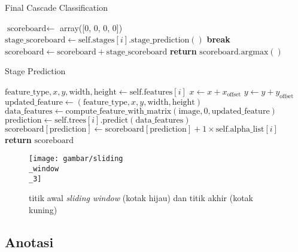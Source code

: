 \begin{algorithm}
  \caption{Final Cascade Classification}
  \begin{algorithmic}[1]
      \State $\text{scoreboard} \gets$ array([0, 0, 0, 0])
        \State $\text{stage\_scoreboard} \gets \text{self.stages}[i].\text{stage\_prediction}()$
         \textbf{break}
        \Else \State $\text{scoreboard} \gets \text{scoreboard} + \text{stage\_scoreboard}$ \EndIf
      \EndFor
      \State \textbf{return} $\text{scoreboard}.\text{argmax}()$
    \EndFunction
  \end{algorithmic}
\end{algorithm}

\begin{algorithm}
  \caption{Stage Prediction}
  \begin{algorithmic}[1]
        \State $\text{feature\_type}, x, y, \text{width}, \text{height} \gets \text{self.features}[i]$
        \State $x \gets x + x_{\text{offset}}$
        \State $y \gets y + y_{\text{offset}}$
        \State $\text{updated\_feature} \gets (\text{feature\_type}, x, y, \text{width}, \text{height})$
        \State $\text{data\_features} \gets \text{compute\_feature\_with\_matrix}(\text{image}, 0, \text{updated\_feature})$
        \State $\text{prediction} \gets \text{self.trees}[i].\text{predict}(\text{data\_features})$
        \State $\text{scoreboard}[\text{prediction}] \gets \text{scoreboard}[\text{prediction}] + 1 \times \text{self.alpha\_list}[i]$
      \EndFor
      \State \textbf{return} $\text{scoreboard}$
    \EndFunction
  \end{algorithmic}
\end{algorithm}

\begin{figure}[H]
  \centering{}
	\texttt{[image: gambar/sliding\\\_window\\\_3]}
  \caption{titik awal \textit{sliding window} (kotak hijau) dan titik akhir (kotak kuning)}
\end{figure}

\subsection{Anotasi}

